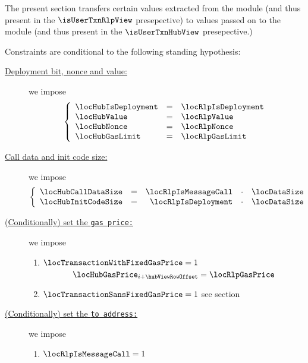 \begin{center}
\end{center}
The present section transfers certain values
extracted from the \rlpTxnMod{} module (and thus present in the $\isUserTxnRlpView$ presepective) to
values passed on to the \hubMod{} module (and thus present in the $\isUserTxnHubView$ presepective.)

Constraints are conditional to the following standing hypothesis:
\begin{description}
	\item[\underline{Deployment bit, nonce and value:}]
		we impose
		\[
			\left\{ \begin{array}{lcl}
				\locHubIsDeployment & = & \locRlpIsDeployment \\
				\locHubValue        & = & \locRlpValue        \\
				\locHubNonce        & = & \locRlpNonce        \\
				\locHubGasLimit     & = & \locRlpGasLimit     \\
			\end{array} \right.
		\]
	\item[\underline{Call data and init code size:}] \label{user txn data: processing: user: data transafer hub to rlp: call data size and init code size}
		we impose
		\[
			\left\{ \begin{array}{lcrcl}
				\locHubCallDataSize & = & \locRlpIsMessageCall & \cdot & \locDataSize \\
				\locHubInitCodeSize & = & \locRlpIsDeployment  & \cdot & \locDataSize \\
			\end{array} \right.
		\]
	\item[\underline{(Conditionally) set the \tt{gas price}:}]
		we impose
		\begin{enumerate}
		        \item
				\If
				$\locTransactionWithFixedGasPrice = 1$ \Then
				\[
					\locHubGasPrice _{i + \hubViewRowOffset}
					=
					\locRlpGasPrice
				\]
			\item
				\If $\locTransactionSansFixedGasPrice = 1$ \Then see
				section \specTodo{}
		\end{enumerate}
	\item[\underline{(Conditionally) set the \tt{to} address:}]
		we impose
		\begin{enumerate}
			\item
				\If $\locRlpIsMessageCall = 1$ \Then

\end{enumerate}
\end{description}
